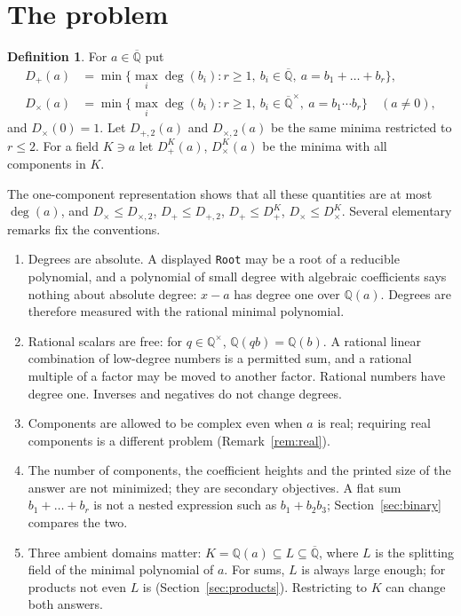 \documentclass[11pt,a4paper]{article}
\theoremstyle{definition}
\newtheorem{definition}[theorem]{Definition}
\theoremstyle{remark}
\newcommand{\Q}{\mathbb{Q}}
\newcommand{\Qbar}{\overline{\Q}}
\newcommand{\dg}{\deg}
\newcommand{\Dp}{D_{+}}
\newcommand{\Dt}{D_{\times}}
\newcommand{\Dtt}{D_{\times,2}}
\newcommand{\Dpp}{D_{+,2}}
\newcommand{\code}[1]{\texttt{#1}}
\newcommand{\Root}{\code{Root}}
\begin{document}
\section{The problem}\label{sec:problem}

\begin{definition}\label{def:D}
For $a\in\Qbar$ put
\begin{align*}
 \Dp(a)&=\min\{\max_i\dg(b_i): r\ge1,\ b_i\in\Qbar,\ a=b_1+\dots+b_r\},\\
 \Dt(a)&=\min\{\max_i\dg(b_i): r\ge1,\ b_i\in\Qbar^\times,\ a=b_1\cdots b_r\}\quad(a\ne0),
\end{align*}
and $\Dt(0)=1$.  Let $\Dpp(a)$ and $\Dtt(a)$ be the same minima restricted to $r\le2$.  For a field
$K\ni a$ let $\Dp^K(a)$, $\Dt^K(a)$ be the minima with all components in $K$.
\end{definition}

The one-component representation shows that all these quantities are at most $\dg(a)$, and
$\Dt\le\Dtt$, $\Dp\le\Dpp$, $\Dp\le\Dp^K$, $\Dt\le\Dt^K$.  Several elementary remarks fix the
conventions.

\begin{enumerate}[label=(\alph*)]
\item Degrees are absolute.  A displayed \Root{} may be a root of a reducible polynomial, and a
  polynomial of small degree with algebraic coefficients says nothing about absolute degree: $x-a$ has
  degree one over $\Q(a)$.  Degrees are therefore measured with the rational minimal polynomial.
\item Rational scalars are free: for $q\in\Q^\times$, $\Q(qb)=\Q(b)$.  A rational linear combination of
  low-degree numbers is a permitted sum, and a rational multiple of a factor may be moved to another
  factor.  Rational numbers have degree one.  Inverses and negatives do not change degrees.
\item Components are allowed to be complex even when $a$ is real; requiring real components is a
  different problem (Remark~\ref{rem:real}).
\item The number of components, the coefficient heights and the printed size of the answer are not
  minimized; they are secondary objectives.  A flat sum $b_1+\dots+b_r$ is not a nested expression such
  as $b_1+b_2b_3$; Section~\ref{sec:binary} compares the two.
\item Three ambient domains matter: $K=\Q(a)\subseteq L\subseteq\Qbar$, where $L$ is the splitting
  field of the minimal polynomial of $a$.  For sums, $L$ is always large enough; for products not even
  $L$ is (Section~\ref{sec:products}).  Restricting to $K$ can change both answers.
\end{enumerate}
\end{document}
